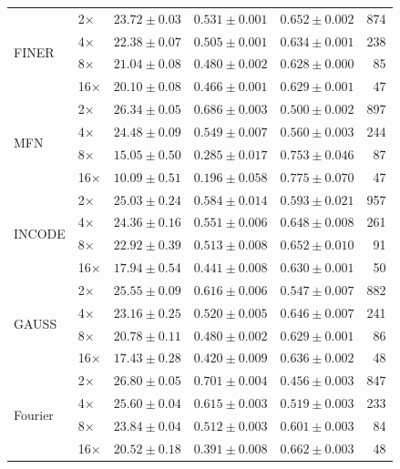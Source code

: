 \documentclass[a4paper,oneside,10pt,ngerman,english]{scrartcl}
\begin{document}
\begin{table}[htbp]
\begin{tabular}{llccc r}
\midrule
\multirow{4}{*}{FINER}
& 2$\times$  & $23.72 \pm 0.03$ & $0.531 \pm 0.001$ & $0.652 \pm 0.002$ & 874 \\
& 4$\times$  & $22.38 \pm 0.07$ & $0.505 \pm 0.001$ & $0.634 \pm 0.001$ & 238 \\
& 8$\times$  & $21.04 \pm 0.08$ & $0.480 \pm 0.002$ & $0.628 \pm 0.000$ & 85 \\
& 16$\times$ & $20.10 \pm 0.08$ & $0.466 \pm 0.001$ & $\mathbf{0.629 \pm 0.001}$ & 47 \\
\midrule
\multirow{4}{*}{MFN}
& 2$\times$  & $26.34 \pm 0.05$ & $0.686 \pm 0.003$ & $0.500 \pm 0.002$ & 897 \\
& 4$\times$  & $24.48 \pm 0.09$ & $0.549 \pm 0.007$ & $0.560 \pm 0.003$ & 244 \\
& 8$\times$  & $15.05 \pm 0.50$ & $0.285 \pm 0.017$ & $0.753 \pm 0.046$ & 87 \\
& 16$\times$ & $10.09 \pm 0.51$ & $0.196 \pm 0.058$ & $0.775 \pm 0.070$ & 47 \\
\midrule
\multirow{4}{*}{INCODE}
& 2$\times$  & $25.03 \pm 0.24$ & $0.584 \pm 0.014$ & $0.593 \pm 0.021$ & 957 \\
& 4$\times$  & $24.36 \pm 0.16$ & $0.551 \pm 0.006$ & $0.648 \pm 0.008$ & 261 \\
& 8$\times$  & $22.92 \pm 0.39$ & $0.513 \pm 0.008$ & $0.652 \pm 0.010$ & 91 \\
& 16$\times$ & $17.94 \pm 0.54$ & $0.441 \pm 0.008$ & $0.630 \pm 0.001$ & 50 \\
\midrule
\multirow{4}{*}{GAUSS}
& 2$\times$  & $25.55 \pm 0.09$ & $0.616 \pm 0.006$ & $0.547 \pm 0.007$ & 882 \\
& 4$\times$  & $23.16 \pm 0.25$ & $0.520 \pm 0.005$ & $0.646 \pm 0.007$ & 241 \\
& 8$\times$  & $20.78 \pm 0.11$ & $0.480 \pm 0.002$ & $0.629 \pm 0.001$ & 86 \\
& 16$\times$ & $17.43 \pm 0.28$ & $0.420 \pm 0.009$ & $0.636 \pm 0.002$ & 48 \\
\midrule
\multirow{4}{*}{Fourier}
& 2$\times$  & $26.80 \pm 0.05$ & $0.701 \pm 0.004$ & $0.456 \pm 0.003$ & 847 \\
& 4$\times$  & $25.60 \pm 0.04$ & $0.615 \pm 0.003$ & $0.519 \pm 0.003$ & 233 \\
& 8$\times$  & $23.84 \pm 0.04$ & $0.512 \pm 0.003$ & $0.601 \pm 0.003$ & 84 \\
& 16$\times$ & $20.52 \pm 0.18$ & $0.391 \pm 0.008$ & $0.662 \pm 0.003$ & 48 \\
\bottomrule
\end{tabular}
\end{table}
\end{document}
